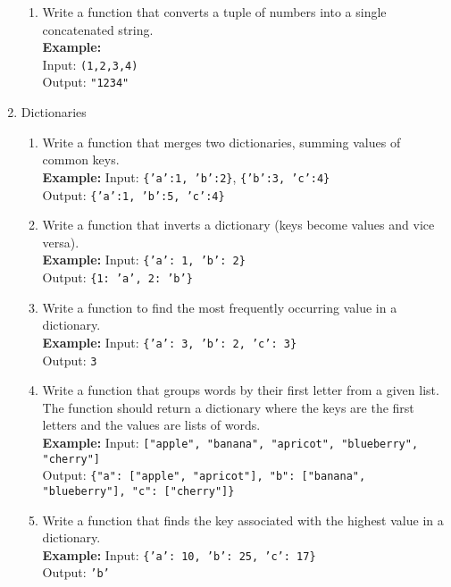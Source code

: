 \documentclass{article}
\begin{document}
\begin{enumerate}
\begin{enumerate}
        \item Write a function that converts a tuple of numbers into a single concatenated string.\\
        \textbf{Example:} \\
        Input: \texttt{(1,2,3,4)} \\
        Output: \texttt{"1234"}
        
    \end{enumerate}
        
    \item Dictionaries

        \begin{enumerate}
            
            \item Write a function that merges two dictionaries, summing values of common keys.\\
            \textbf{Example:} Input: \texttt{\{'a':1, 'b':2\}}, \texttt{\{'b':3, 'c':4\}}\\
            Output: \texttt{\{'a':1, 'b':5, 'c':4\}}
            
            \item Write a function that inverts a dictionary (keys become values and vice versa).\\
            \textbf{Example:} Input: \texttt{\{'a': 1, 'b': 2\}}\\
            Output: \texttt{\{1: 'a', 2: 'b'\}}
            
            \item Write a function to find the most frequently occurring value in a dictionary.\\
            \textbf{Example:} Input: \texttt{\{'a': 3, 'b': 2, 'c': 3\}}\\
            Output: \texttt{3}
            
            \item Write a function that groups words by their first letter from a given list. The function should return a dictionary where the keys are the first letters and the values are lists of words.\\
            \textbf{Example:} Input: \texttt{["apple", "banana", "apricot", "blueberry", "cherry"]}\\
            Output: \texttt{\{"a": ["apple", "apricot"], "b": ["banana", "blueberry"], "c": ["cherry"]\}}
            
            \item Write a function that finds the key associated with the highest value in a dictionary.\\
            \textbf{Example:} Input: \texttt{\{'a': 10, 'b': 25, 'c': 17\}}\\
            Output: \texttt{'b'}
        \end{enumerate}
    

\end{enumerate}
\end{document}
